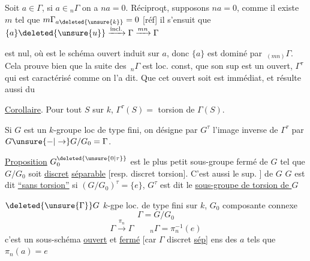 Soit $a\in\Gamma$,  si $a\in{}_n\Gamma$ on a
$na=0$. Réciproqt, supposons $na=0$,
comme il existe $m$ tel que $m\Gamma_{a\deleted{\unsure{k}}}=0$
[réf] il s'ensuit que  $\{a\}\deleted{\unsure{u}}\xrightarrow{\mathrm{incl.}}\Gamma\xrightarrow{mn}\Gamma$

est nul, où  est le schéma ouvert
induit sur $a$, donc $\{a\}$ est dominé
par $\,{}_{(mn)}\Gamma$. Cela prouve bien que
la suite des $\,{}_n\Gamma$ est loc. const, que son
sup est un ouvert, $\Gamma^\tau$ qui est caractérisé
comme on l'a dit. Que cet ouvert
soit  est immédiat, et résulte aussi du

 \uline{Corollaire}. Pour tout $S$  sur $k$,
$\Gamma^\tau(S)={}$ torsion de $\Gamma(S)$. 


Si $G$ est un  $k$-groupe
 loc de type fini, on
désigne par $G^\tau$ l'image inverse de
$\Gamma^\tau$ par $G\unsure{-|\to}G/G_0=\Gamma$.

\uline{Proposition} $G^{\deleted{\unsure{0|\tau}}}_0$  est le plus petit sous-groupe
fermé de $G$ tel que $G/G_0$ soit
\uline{discret} \uline{séparable} [resp. discret 
torsion]. C'est aussi le sup. \inserted{\unsure{(croissant)|croissant)} des sous-groupes [ouverts; \unsure{ou : ouvert} \unsure{``\quad''} }]
de $G$    
$G$ est dit \uline{``sans torsion''} si
$(G/G_0)^\tau=\{e\}$,  $G^\tau$ est dit le
\uline{sous-groupe de torsion de $G$}

$\deleted{\unsure{\Gamma}}G$ \quad $k$-gpe loc. de type fini sur $k$,
$G_0$ \quad composante connexe
\[
\Gamma=G/G_0
\]
\[
\Gamma\xrightarrow{\pi_n}\Gamma\qquad {}_n\Gamma=\pi_n^{-1}(e)
\]
c'est un sous-schéma \uline{ouvert} et \uline{fermé} [car $\Gamma$
discret \uline{sép}] ens des $a$ tels que $\pi_n(a)=e$

